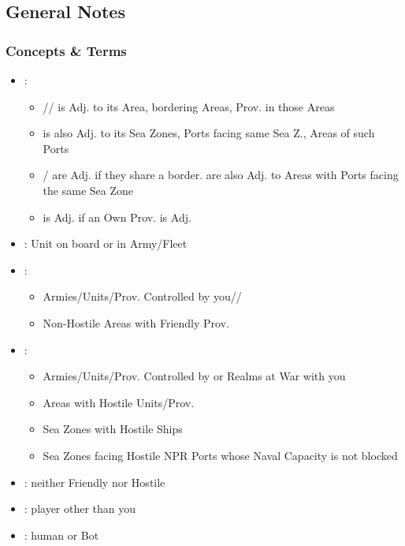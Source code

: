\documentclass[10pt]{article}
\begin{document}
\addbackground
\addfooter


\subsection*{General Notes }
\subsubsection*{Concepts \& Terms}
\begin{itemize}
	\item {}:
	\begin{itemize}
		\item {}// is Adj. to its Area, bordering Areas, Prov. in those Areas
		\item {} is also Adj. to its Sea Zones, Ports facing same Sea Z., Areas of such Ports
		\item {}/ are Adj. if they share a border.  are also Adj. to Areas with Ports facing the same Sea Zone
		\item {} is Adj. if an Own Prov. is Adj.
	\end{itemize}
	\item {}: Unit on board or in Army/Fleet
	\item {}:
	\begin{itemize}
		\item Armies/Units/Prov. Controlled by you/\ally/\vassal
		\item Non-Hostile Areas with Friendly Prov.
	\end{itemize}
	\item {}:
	\begin{itemize}
		\item Armies/Units/Prov. Controlled by \rebels or Realms at War with you
		\item Areas with Hostile Units/Prov.
		\item Sea Zones with Hostile Ships
		\item Sea Zones facing Hostile NPR Ports whose Naval Capacity is not blocked
	\end{itemize}
	\item {}: neither Friendly nor Hostile
	\item {}: player other than you
	\item {}: human or Bot

\end{itemize}
\end{document}
